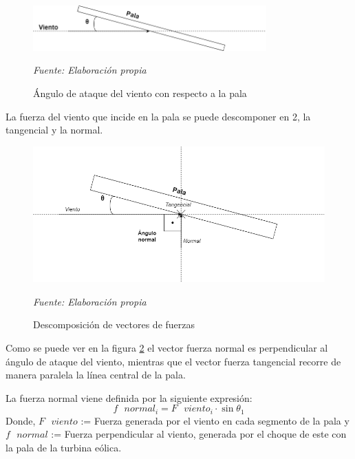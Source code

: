     \textbf{}
    \begin{figure}[H]
    \centering
    \includegraphics[width=0.8\textwidth]{images/dibujo angulo ataque.drawio.png}
    \caption{Ángulo de ataque del viento con respecto a la pala}
    \textit{Fuente: Elaboración propia}
    \label{fig:dibujo_angulo_ataque}
\end{figure}

La fuerza del viento que incide en la pala se puede descomponer en 2, la tangencial y la normal. \\

    \textbf{}
    \begin{figure}[H]
    \centering
    \includegraphics[width=1\textwidth]{images/dibujo fuerzas.drawio.png}
    \caption{Descomposición de vectores de fuerzas}
    \textit{Fuente: Elaboración propia}
    \label{fig:dibujo_fuerzas}
\end{figure}


Como se puede ver en la figura \ref{fig:dibujo_fuerzas} el vector fuerza normal es perpendicular al ángulo de ataque del viento, mientras que el vector fuerza tangencial recorre de manera paralela la línea central de la pala.


 \begin{definicion}
 La fuerza normal viene definida por la siguiente expresión:
  $$ f \text{ } normal_i = F \text{ } viento_i \cdot \sin{\theta_1}$$
Donde,
\centering $F \text{ } viento$ := Fuerza generada por el viento en cada segmento de la pala y $f \text{ } normal$ := Fuerza perpendicular al viento, generada por el choque de este con la pala de la turbina eólica.
 \label{def:fuerza_normal}
 \end{definicion}
 
